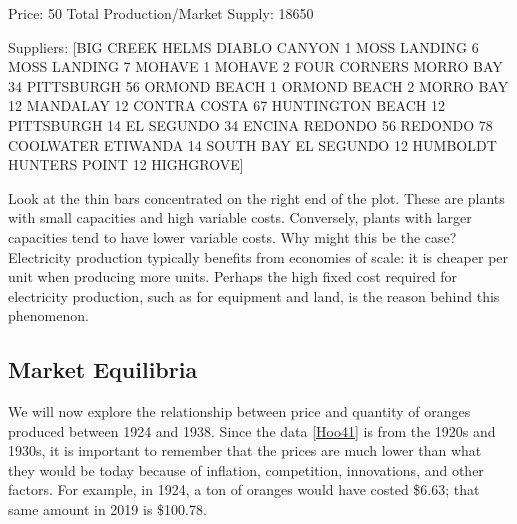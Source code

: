 \documentclass[letterpaper,10pt,english]{jupyterBook}
\begin{document}
\begin{sphinxVerbatim}[commandchars=\\\{\}]
Price: \PYGZdl{}50
Total Production/Market Supply:  18650

Suppliers:  [\PYGZsq{}BIG CREEK\PYGZsq{} \PYGZsq{}HELMS\PYGZsq{} \PYGZsq{}DIABLO CANYON 1\PYGZsq{} \PYGZsq{}MOSS LANDING 6\PYGZsq{} \PYGZsq{}MOSS LANDING 7\PYGZsq{}
 \PYGZsq{}MOHAVE 1\PYGZsq{} \PYGZsq{}MOHAVE 2\PYGZsq{} \PYGZsq{}FOUR CORNERS\PYGZsq{} \PYGZsq{}MORRO BAY 3\PYGZam{}4\PYGZsq{} \PYGZsq{}PITTSBURGH 5\PYGZam{}6\PYGZsq{}
 \PYGZsq{}ORMOND BEACH 1\PYGZsq{} \PYGZsq{}ORMOND BEACH 2\PYGZsq{} \PYGZsq{}MORRO BAY 1\PYGZam{}2\PYGZsq{} \PYGZsq{}MANDALAY 1\PYGZam{}2\PYGZsq{}
 \PYGZsq{}CONTRA COSTA 6\PYGZam{}7\PYGZsq{} \PYGZsq{}HUNTINGTON BEACH 1\PYGZam{}2\PYGZsq{} \PYGZsq{}PITTSBURGH 1\PYGZhy{}4\PYGZsq{}
 \PYGZsq{}EL SEGUNDO 3\PYGZam{}4\PYGZsq{} \PYGZsq{}ENCINA\PYGZsq{} \PYGZsq{}REDONDO 5\PYGZam{}6\PYGZsq{} \PYGZsq{}REDONDO 7\PYGZam{}8\PYGZsq{} \PYGZsq{}COOLWATER\PYGZsq{}
 \PYGZsq{}ETIWANDA 1\PYGZhy{}4\PYGZsq{} \PYGZsq{}SOUTH BAY\PYGZsq{} \PYGZsq{}EL SEGUNDO 1\PYGZam{}2\PYGZsq{} \PYGZsq{}HUMBOLDT\PYGZsq{}
 \PYGZsq{}HUNTERS POINT 1\PYGZam{}2\PYGZsq{} \PYGZsq{}HIGHGROVE\PYGZsq{}]
\end{sphinxVerbatim}

\noindent{}

\noindent{}

\sphinxAtStartPar
Look at the thin bars concentrated on the right end of the plot. These are plants with small capacities and high variable costs. Conversely, plants with larger capacities tend to have lower variable costs. Why might this be the case? Electricity production typically benefits from economies of scale: it is cheaper per unit when producing more units. Perhaps the high fixed cost required for electricity production, such as for equipment and land, is the reason behind this phenomenon.


\subsection{Market Equilibria}
\label{\detokenize{content/02-supply/03-market-equilibria:market-equilibria}}\label{\detokenize{content/02-supply/03-market-equilibria::doc}}
\sphinxAtStartPar
We will now explore the relationship between price and quantity of oranges produced between 1924 and 1938. Since the data {[}\hyperlink{cite.content/references:id3}{Hoo41}{]} is from the 1920s and 1930s, it is important to remember that the prices are much lower than what they would be today because of inflation, competition, innovations, and other factors. For example, in 1924, a ton of oranges would have costed \$6.63; that same amount in 2019 is \$100.78.
\end{document}
